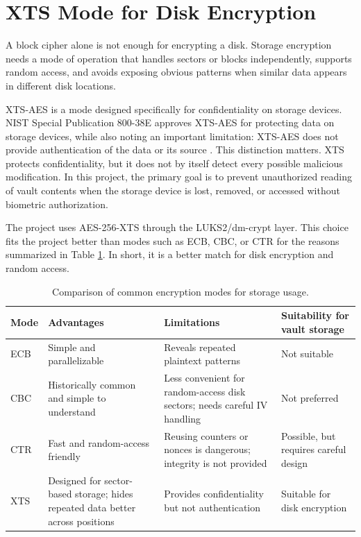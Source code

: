 \section{XTS Mode for Disk Encryption}

A block cipher alone is not enough for encrypting a disk. Storage encryption needs a mode of operation that handles sectors or blocks independently, supports random access, and avoids exposing obvious patterns when similar data appears in different disk locations.

XTS-AES is a mode designed specifically for confidentiality on storage devices. NIST Special Publication 800-38E approves XTS-AES for protecting data on storage devices, while also noting an important limitation: XTS-AES does not provide authentication of the data or its source \cite{nistXtsAes}. This distinction matters. XTS protects confidentiality, but it does not by itself detect every possible malicious modification. In this project, the primary goal is to prevent unauthorized reading of vault contents when the storage device is lost, removed, or accessed without biometric authorization.

The project uses AES-256-XTS through the LUKS2/dm-crypt layer. This choice fits the project better than modes such as ECB, CBC, or CTR for the reasons summarized in Table \ref{tab:modes}. In short, it is a better match for disk encryption and random access.

\begin{table}[!htbp]
\centering
\caption{\label{tab:modes}Comparison of common encryption modes for storage usage.}
\begin{tabularx}{\textwidth}{lXXX}
\toprule
Mode & Advantages & Limitations & Suitability for vault storage\\
\midrule
ECB & Simple and parallelizable & Reveals repeated plaintext patterns & Not suitable\\
CBC & Historically common and simple to understand & Less convenient for random-access disk sectors; needs careful IV handling & Not preferred\\
CTR & Fast and random-access friendly & Reusing counters or nonces is dangerous; integrity is not provided & Possible, but requires careful design\\
XTS & Designed for sector-based storage; hides repeated data better across positions & Provides confidentiality but not authentication & Suitable for disk encryption\\
\bottomrule
\end{tabularx}
\end{table}

